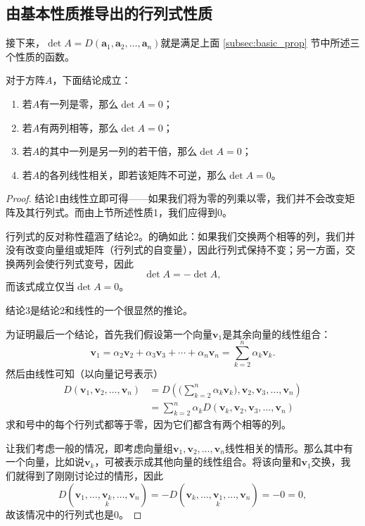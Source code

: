 \subsection{由基本性质推导出的行列式性质}

接下来，$\det A=D(\mathbf{a}_{1},\mathbf{a}_{2},\ldots,\mathbf{a}_{n})$就是满足上面 \ref{subsec:basic_prop} 节中所述三个性质的函数。

\begin{proposition}\label{prop:det_0}
  对于方阵$A$，下面结论成立：
  \begin{enumerate}
    \item 若$A$有一列是零，那么$\det A = 0$；
    \item 若$A$有两列相等，那么$\det A = 0$；
    \item 若$A$的其中一列是另一列的若干倍，那么$\det A = 0$；
    \item 若$A$的各列线性相关，即若该矩阵不可逆，那么$\det A = 0$。
  \end{enumerate}
\end{proposition}

\begin{proof}
  结论1由线性立即可得——如果我们将为零的列乘以零，我们并不会改变矩阵及其行列式。而由上节所述性质1，我们应得到$0$。

  行列式的反对称性蕴涵了结论2。的确如此：如果我们交换两个相等的列，我们并没有改变向量组或矩阵（行列式的自变量），因此行列式保持不变；另一方面，交换两列会使行列式变号，因此\[\det A = -\det A,\]而该式成立仅当$\det A = 0$。

  结论3是结论2和线性的一个很显然的推论。

  为证明最后一个结论，首先我们假设第一个向量$\mathbf{v}_1$是其余向量的线性组合：\[\mathbf{v}_1=\alpha_2\mathbf{v}_2+\alpha_3\mathbf{v}_3+\cdots+\alpha_n\mathbf{v}_n=\sum_{k=2}^n\alpha_k\mathbf{v}_k.\]
  然后由线性可知（以向量记号表示）
  \[\begin{aligned}
    D(\mathbf{v}_{1},\mathbf{v}_{2},\ldots,\mathbf{v}_{n})&=D\left(\bigl(\sum_{k=2}^{n}\alpha_{k}\mathbf{v}_{k}\bigr),\mathbf{v}_{2},\mathbf{v}_{3},\ldots,\mathbf{v}_{n}\right)\\
    &=\sum_{k=2}^{n}\alpha_{k}D(\mathbf{v}_{k},\mathbf{v}_{2},\mathbf{v}_{3},\ldots,\mathbf{v}_{n})
  \end{aligned}\]
  求和号中的每个行列式都等于零，因为它们都含有两个相等的列。

  让我们考虑一般的情况，即考虑向量组$\mathbf{v}_1,\mathbf{v}_2,\ldots,\mathbf{v}_n$线性相关的情形。那么其中有一个向量，比如说$\mathbf{v}_k$，可被表示成其他向量的线性组合。将该向量和$\mathbf{v}_1$交换，我们就得到了刚刚讨论过的情形，因此\[D(\mathbf{v}_1,\ldots,\underset{k}{\mathbf{v}_k},\ldots,\mathbf{v}_n)=-D(\mathbf{v}_k,\ldots,\underset{k}{\mathbf{v}_1},\ldots,\mathbf{v}_n)=-0=0,\]
  故该情况中的行列式也是$0$。
\end{proof}

